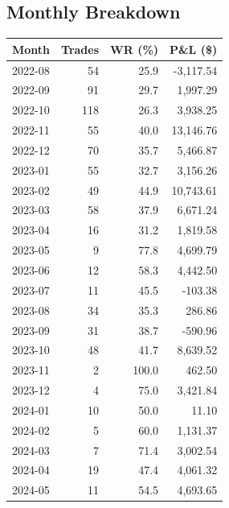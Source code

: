 \documentclass[11pt,a4paper,twoside]{article}
\begin{document}
\subsection*{Monthly Breakdown}
\noindent\begin{center}
\begin{tabular}{>{\color{txtmain}}l rrr}
\toprule
\rowcolor{cardbg}
\textbf{Month} & \textbf{Trades} & \textbf{WR (\%)} & \textbf{P\&L (\$)} \\
\midrule
2022-08 & 54 & 25.9 & \textcolor{lossred}{-3,117.54} \\
2022-09 & 91 & 29.7 & \textcolor{wingreen}{1,997.29} \\
2022-10 & 118 & 26.3 & \textcolor{wingreen}{3,938.25} \\
2022-11 & 55 & 40.0 & \textcolor{wingreen}{13,146.76} \\
2022-12 & 70 & 35.7 & \textcolor{wingreen}{5,466.87} \\
2023-01 & 55 & 32.7 & \textcolor{wingreen}{3,156.26} \\
2023-02 & 49 & 44.9 & \textcolor{wingreen}{10,743.61} \\
2023-03 & 58 & 37.9 & \textcolor{wingreen}{6,671.24} \\
2023-04 & 16 & 31.2 & \textcolor{wingreen}{1,819.58} \\
2023-05 & 9 & 77.8 & \textcolor{wingreen}{4,699.79} \\
2023-06 & 12 & 58.3 & \textcolor{wingreen}{4,442.50} \\
2023-07 & 11 & 45.5 & \textcolor{lossred}{-103.38} \\
2023-08 & 34 & 35.3 & \textcolor{wingreen}{286.86} \\
2023-09 & 31 & 38.7 & \textcolor{lossred}{-590.96} \\
2023-10 & 48 & 41.7 & \textcolor{wingreen}{8,639.52} \\
2023-11 & 2 & 100.0 & \textcolor{wingreen}{462.50} \\
2023-12 & 4 & 75.0 & \textcolor{wingreen}{3,421.84} \\
2024-01 & 10 & 50.0 & \textcolor{wingreen}{11.10} \\
2024-02 & 5 & 60.0 & \textcolor{wingreen}{1,131.37} \\
2024-03 & 7 & 71.4 & \textcolor{wingreen}{3,002.54} \\
2024-04 & 19 & 47.4 & \textcolor{wingreen}{4,061.32} \\
2024-05 & 11 & 54.5 & \textcolor{wingreen}{4,693.65} \\

\end{tabular}
\end{center}
\end{document}
